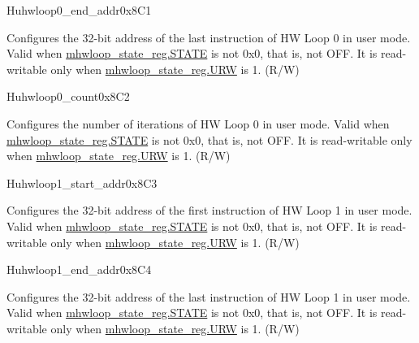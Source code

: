 \begin{register}{H}{uhwloop0\_end\_addr}{0x8C1}\label{regdesc:uhloop0_end_addr}
%
\regnewline%
\begin{regdesc}\begin{reglist}
\label{fielddesc:UHWLP0_EA}\item [EA] Configures the 32-bit address of the last instruction of HW Loop 0 in user mode. Valid when \hyperref[fielddesc:HWSTATE]{mhwloop\_state\_reg.STATE} is not 0x0, that is, not OFF. It is read-writable only when \hyperref[fielddesc:HWSTATE]{mhwloop\_state\_reg.URW} is 1. (R/W)
\end{reglist}\end{regdesc}
\end{register}
\begin{register}{H}{uhwloop0\_count}{0x8C2}\label{regdesc:uhloop0_count}
%
%
\regnewline%
\begin{regdesc}\begin{reglist}
\label{fielddesc:UHWLP0_CNT}\item [Count]Configures the number of iterations of HW Loop 0 in user mode. Valid when \hyperref[fielddesc:HWSTATE]{mhwloop\_state\_reg.STATE} is not 0x0, that is, not OFF. It is read-writable only when \hyperref[fielddesc:HWSTATE]{mhwloop\_state\_reg.URW} is 1. (R/W)
\end{reglist}\end{regdesc}
\end{register}

\begin{register}{H}{uhwloop1\_start\_addr}{0x8C3}\label{regdesc:uhloop1_start_addr}
%
\regnewline%
\begin{regdesc}\begin{reglist}
\label{fielddesc:UHWLP1_SA}\item [SA] Configures the 32-bit address of the first instruction of HW Loop 1 in user mode. Valid when \hyperref[fielddesc:HWSTATE]{mhwloop\_state\_reg.STATE} is not 0x0, that is, not OFF. It is read-writable only when \hyperref[fielddesc:HWSTATE]{mhwloop\_state\_reg.URW} is 1. (R/W)
\end{reglist}\end{regdesc}
\end{register}

\begin{register}{H}{uhwloop1\_end\_addr}{0x8C4}\label{regdesc:uhloop1_end_addr}
%
\regnewline%
\begin{regdesc}\begin{reglist}
\label{fielddesc:UHWLP1_EA}\item [EA]  Configures the 32-bit address of the last instruction of HW Loop 1 in user mode. Valid when \hyperref[fielddesc:HWSTATE]{mhwloop\_state\_reg.STATE} is not 0x0, that is, not OFF. It is read-writable only when \hyperref[fielddesc:HWSTATE]{mhwloop\_state\_reg.URW} is 1. (R/W)
\end{reglist}\end{regdesc}
\end{register}

